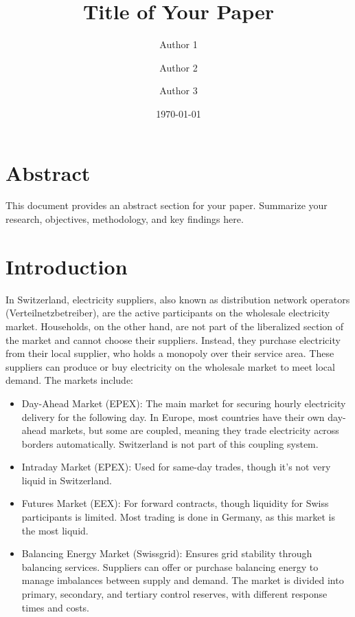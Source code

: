 \documentclass[12pt]{article}
\title{Title of Your Paper}
\author{Author 1 \and Author 2 \and Author 3}
\date{\today}
\begin{document}
\maketitle

\newpage
\tableofcontents
\newpage

\section{Abstract}
This document provides an abstract section for your paper. Summarize your research, objectives, methodology, and key findings here.

\newpage

\section{Introduction}
In Switzerland, electricity suppliers, also known as distribution network
operators (Verteilnetzbetreiber), are the active participants on the wholesale
electricity market. Households, on the other hand, are not part of the
liberalized section of the market and cannot choose their suppliers. Instead,
they purchase electricity from their local supplier, who holds a monopoly over their service area.
These suppliers can produce or buy electricity on the wholesale market to meet local demand. The markets include:

\begin{itemize}
\item Day-Ahead Market (EPEX): The main market for securing hourly electricity
delivery for the following day. In Europe, most countries have their own
day-ahead markets, but some are coupled, meaning they trade electricity across
borders automatically. Switzerland is not part of this coupling system.
\item Intraday Market (EPEX): Used for same-day trades, though it's not very liquid
in Switzerland.
\item Futures Market (EEX): For forward contracts, though liquidity for Swiss
participants is limited. Most trading is done in Germany, as this market is 
the most liquid. 
\item Balancing Energy Market (Swissgrid): Ensures grid stability through balancing
services. Suppliers can offer or purchase balancing energy to manage imbalances
between supply and demand. The market is divided into primary, secondary, and
tertiary control reserves, with different response times and costs.
\end{itemize}
\end{document}
